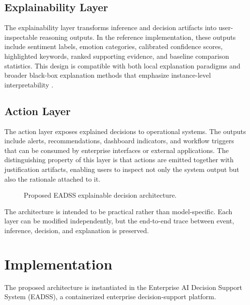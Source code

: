 \documentclass[conference]{IEEEtran}
\begin{document}
\subsection{Explainability Layer}
The explainability layer transforms inference and decision artifacts into user-inspectable reasoning outputs. In the reference implementation, these outputs include sentiment labels, emotion categories, calibrated confidence scores, highlighted keywords, ranked supporting evidence, and baseline comparison statistics. This design is compatible with both local explanation paradigms and broader black-box explanation methods that emphasize instance-level interpretability \cite{ribeiro2016why,lundberg2017unified}.

\subsection{Action Layer}
The action layer exposes explained decisions to operational systems. The outputs include alerts, recommendations, dashboard indicators, and workflow triggers that can be consumed by enterprise interfaces or external applications. The distinguishing property of this layer is that actions are emitted together with justification artifacts, enabling users to inspect not only the system output but also the rationale attached to it.

\begin{figure}[t]
\centering
{}
\caption{Proposed EADSS explainable decision architecture.}
\label{fig:architecture}
\end{figure}

The architecture is intended to be practical rather than model-specific. Each layer can be modified independently, but the end-to-end trace between event, inference, decision, and explanation is preserved.

\section{Implementation}
The proposed architecture is instantiated in the Enterprise AI Decision Support System (EADSS), a containerized enterprise decision-support platform.
\end{document}
